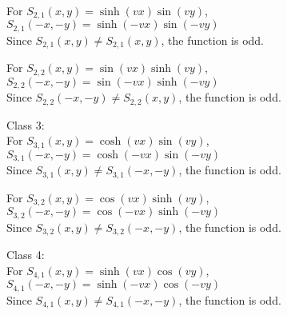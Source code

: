 \documentclass[12pt, executivepaper]{article}
\begin{document}
\begin{flushleft}
\vspace{3mm}

For $S_{2,1}(x,y)=\sinh(vx)\sin(vy)$, \\

$S_{2,1}(-x,-y)=\sinh(-vx)\sin(-vy)$ \\

Since $S_{2,1}(x,y) \neq S_{2,1}(x,y)$, the function is odd. \\

\vspace{3mm}

For $S_{2,2}(x,y)=\sin(vx)\sinh(vy)$, \\

$S_{2,2}(-x,-y)=\sin(-vx)\sinh(-vy)$ \\

Since $S_{2,2}(-x,-y) \neq S_{2,2}(x,y)$, the function is odd.

\vspace{3mm}

Class 3: \\
For $S_{3,1}(x,y)=\cosh(vx)\sin(vy)$, \\

$S_{3,1}(-x,-y)=\cosh(-vx)\sin(-vy)$ \\

Since $S_{3,1}(x,y) \neq S_{3,1}(-x,-y)$, the function is odd. \\

\vspace{3mm}

For $S_{3,2}(x,y)=\cos(vx)\sinh(vy)$, \\

$S_{3,2}(-x,-y)=\cos(-vx)\sinh(-vy)$ \\

Since $S_{3,2}(x,y) \neq S_{3,2}(-x,-y)$, the function is odd. \\

\vspace{3mm}

\pagebreak

\vspace*{-40mm}

Class 4: \\
For $S_{4,1}(x,y)=\sinh(vx)\cos(vy)$, \\

$S_{4,1}(-x,-y)=\sinh(-vx)\cos(-vy)$ \\

Since $S_{4,1}(x,y) \neq S_{4,1}(-x,-y)$, the function is odd. \\


\end{flushleft}
\end{document}
